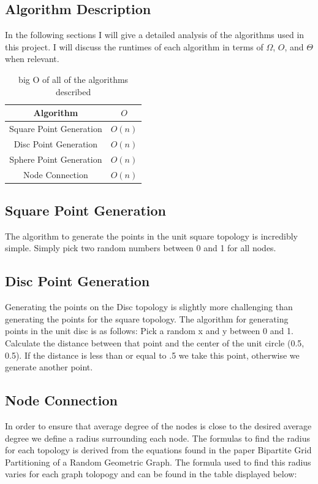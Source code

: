 \documentclass{article}
\begin{document}
	\subsection{Algorithm Description}
		In the following sections I will give a detailed analysis of the algorithms used in this project.
		I will discuss the runtimes of each algorithm in terms of $\Omega$, $O$, and $\Theta$ when relevant.

    	\begin{center}
    		\begin{table}
    			\begin{tabular}{ |c|c| }
    				\hline
    				Algorithm & $O$ \\
    				\hline
    				Square Point Generation & $O(n)$ \\
    				\hline
    				Disc Point Generation & $O(n)$ \\
    				\hline
            Sphere Point Generation & $O(n)$ \\
            \hline
    				Node Connection & $O(n)$ \\
    				\hline
    			\end{tabular}
          \caption{big O of all of the algorithms described}
    		\end{table}
    	\end{center}

  \subsection{Square Point Generation}
		The algorithm to generate the points in the unit square topology is incredibly simple.
		Simply pick two random numbers between 0 and 1 for all nodes.

  \subsection{Disc Point Generation}
		Generating the points on the Disc topology is slightly more challenging than generating the points for the square topology.
    The algorithm for generating points in the unit disc is as follows:
    Pick a random x and y between 0 and 1.
    Calculate the distance between that point and the center of the unit circle (0.5, 0.5).
    If the distance is less than or equal to .5 we take this point, otherwise we generate another point.

	\subsection{Node Connection}
		In order to ensure that average degree of the nodes is close to the desired average degree we define a radius surrounding each node.
		The formulas to find the radius for each topology is derived from the equations found in the paper Bipartite Grid Partitioning of a Random Geometric Graph\cite{chen2017bipartite}.
		The formula used to find this radius varies for each graph tolopogy and can be found in the table displayed below:
\end{document}
